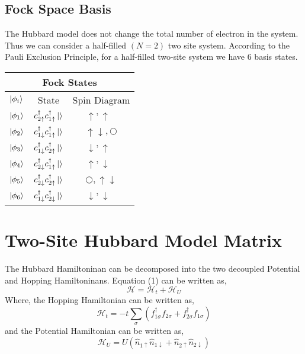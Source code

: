 \documentclass{article}
\begin{document}
\subsection{Fock Space Basis}
The Hubbard model does not change the total number of electron in the system. Thus we can consider
a half-filled $(N = 2)$ two site system. According to the Pauli Exclusion Principle, for a half-filled two-site system we
have 6 basis states.
\begin{center}
\begin{tabular} {lcc}
    \toprule
    \multicolumn{3}{c}{Fock States} \\
    \midrule
    $ \ket{\phi_{i}}$ & State & Spin Diagram \\\midrule
    $ \ket{\phi_{1}}$ & $c^{\dagger}_{2\uparrow}c^{\dagger}_{1\uparrow}\ket{} $   &   $ \uparrow ,\uparrow\text{\ } $\\ \midrule
    $ \ket{\phi_{2}}$ & $c^{\dagger}_{1\downarrow}c^{\dagger}_{1\uparrow}\ket{} $ &   $  \uparrow\downarrow,\bigcirc $\\ \midrule
    $ \ket{\phi_{3}}$ & $c^{\dagger}_{1\downarrow}c^{\dagger}_{2\uparrow}\ket{} $ &   $ \downarrow ,\uparrow \text{\ }$\\ \midrule
    $ \ket{\phi_{4}}$ & $c^{\dagger}_{2\downarrow}c^{\dagger}_{1\uparrow}\ket{} $ &   $ \uparrow ,\downarrow \text{\ }$\\ \midrule
    $ \ket{\phi_{5}}$ & $c^{\dagger}_{2\downarrow}c^{\dagger}_{2\uparrow}\ket{} $ &   $ \bigcirc,\uparrow\downarrow $\\ \midrule
    $ \ket{\phi_{6}}$ & $c^{\dagger}_{1\downarrow}c^{\dagger}_{2\downarrow}\ket{} $ & $ \downarrow,\downarrow\text{\ } $\\ \midrule
    \bottomrule
\end{tabular}
\end{center}
\section{Two-Site Hubbard Model Matrix}
The Hubbard Hamiltoninan can be decomposed into the two decoupled Potential and Hopping Hamiltoninans.
Equation (1) can be written as,
\begin{equation}
\mathcal{H} = \mathcal{H}_t + \mathcal{H}_U
\end{equation}
Where, the Hopping Hamiltonian can be written as,
\begin{equation}
  \mathcal{H}_t = -t\sum_{\sigma} \left(f_{1 \sigma} ^{\dagger}f_{2 \sigma}+f_{2 \sigma} ^{\dagger}f_{1 \sigma} \right)
\end{equation}
and the Potential Hamiltonian can be written as,
\begin{equation}
  \mathcal{H}_U = U\left(\hat{n}_{1\uparrow} \hat{n}_{1\downarrow} + \hat{n}_{2\uparrow} \hat{n}_{2\downarrow} \right)
\end{equation}
\end{document}
